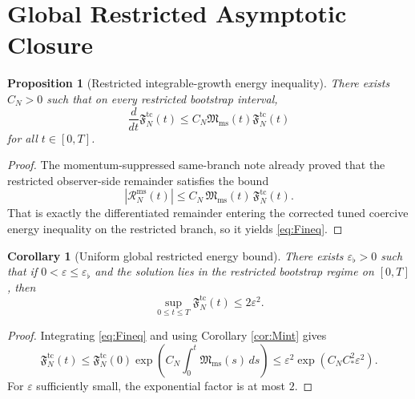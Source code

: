 \documentclass[11pt]{article}
\newtheorem{proposition}{Proposition}
\newtheorem{corollary}{Corollary}
\begin{document}
\section{Global Restricted Asymptotic Closure}

\begin{proposition}[Restricted integrable-growth energy inequality]
\label{prop:Fineq}
There exists \(C_N>0\) such that on every restricted bootstrap interval,
\begin{equation}
\frac{d}{dt}\mathfrak F_N^{\mathrm{tc}}(t)
\le
C_N\mathfrak M_{\mathrm{ms}}(t)\mathfrak F_N^{\mathrm{tc}}(t)
\label{eq:Fineq}
\end{equation}
for all \(t\in[0,T]\).
\end{proposition}

\begin{proof}
The momentum-suppressed same-branch note already proved that the restricted observer-side remainder satisfies the bound
\[
|\mathcal R_N^{\mathrm{ms}}(t)|
\le
C_N\,\mathfrak M_{\mathrm{ms}}(t)\,\mathfrak F_N^{\mathrm{tc}}(t).
\]
That is exactly the differentiated remainder entering the corrected tuned coercive energy inequality on the restricted branch, so it yields \eqref{eq:Fineq}.
\end{proof}

\begin{corollary}[Uniform global restricted energy bound]
\label{cor:Fglobal}
There exists \(\varepsilon_\flat>0\) such that if \(0<\varepsilon\le \varepsilon_\flat\) and the solution lies in the restricted bootstrap regime on \([0,T]\), then
\begin{equation}
\sup_{0\le t\le T}\mathfrak F_N^{\mathrm{tc}}(t)\le 2\varepsilon^2.
\label{eq:Fglobal}
\end{equation}
\end{corollary}

\begin{proof}
Integrating \eqref{eq:Fineq} and using Corollary \ref{cor:Mint} gives
\[
\mathfrak F_N^{\mathrm{tc}}(t)
\le
\mathfrak F_N^{\mathrm{tc}}(0)
\exp\!\left(C_N\int_0^t \mathfrak M_{\mathrm{ms}}(s)\,ds\right)
\le
\varepsilon^2\exp(C_NC_\ast^2\varepsilon^2).
\]
For \(\varepsilon\) sufficiently small, the exponential factor is at most \(2\).
\end{proof}
\end{document}
